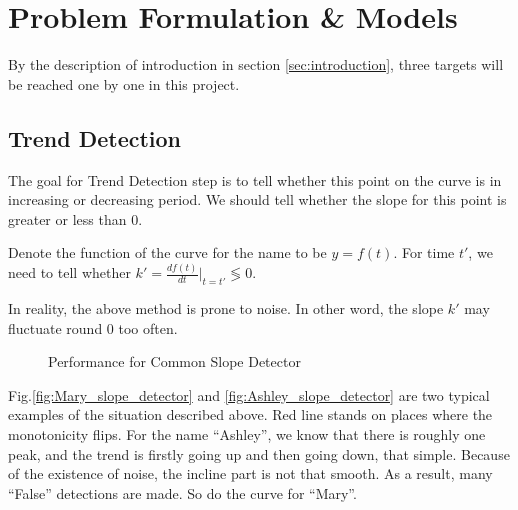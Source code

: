 \documentclass[journal]{IEEEtran}
\begin{document}

\section{Problem Formulation \& Models} %
\label{sec:problem_formulation_&_models}
By the description of introduction in section \ref{sec:introduction}, three targets will be reached one by one in this project.

\subsection{Trend Detection} %
\label{sub:trend_detection}
The goal for Trend Detection step is to tell whether this point on the curve is in increasing or decreasing period. We should tell whether the slope for this point is greater or less than 0.

Denote the function of the curve for the name to be $y = f(t)$. For time $t'$, we need to tell whether $k' = \frac{d f(t)}{d t}|_{t = t'} \lessgtr 0$. 

In reality, the above method is prone to noise. In other word, the slope $k'$ may fluctuate round $0$ too often. 
\begin{figure}[ht]
\centering
{}
\quad
{}
\caption{Performance for Common Slope Detector}
\label{fig:Performance for Slope Detector}
\end{figure}

Fig.\ref{fig:Mary_slope_detector} and \ref{fig:Ashley_slope_detector} are two typical examples of the situation described above. Red line stands on places where the monotonicity flips. For the name ``Ashley'', we know that there is roughly one peak, and the trend is firstly going up and then going down, that simple. Because of the existence of noise, the incline part is not that smooth. As a result, many ``False'' detections are made. So do the curve for ``Mary''.
\end{document}
